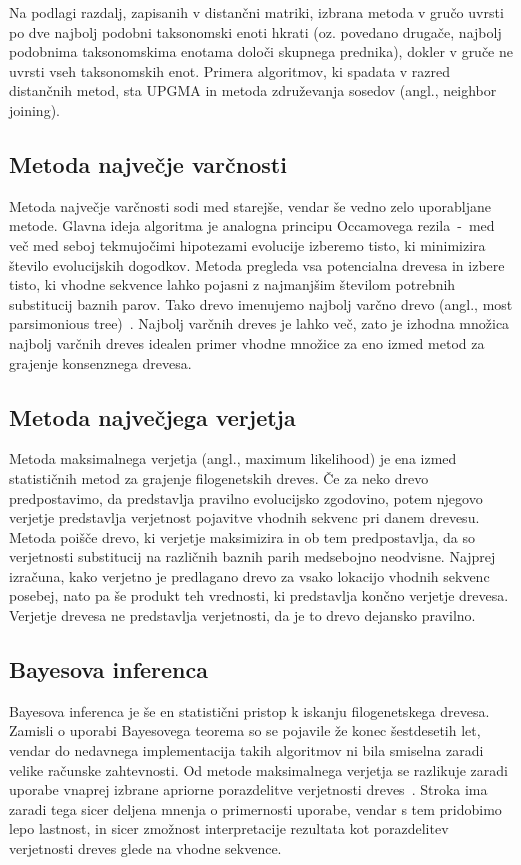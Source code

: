 \documentclass[a4paper, 12pt]{book}
\begin{document}
\noindent Na podlagi razdalj, zapisanih v distančni matriki, izbrana metoda v gručo 
uvrsti po dve najbolj podobni taksonomski enoti hkrati (oz. povedano drugače, 
najbolj podobnima taksonomskima enotama določi skupnega prednika), dokler v 
gruče ne uvrsti vseh taksonomskih enot. Primera algoritmov, ki spadata v razred 
distančnih metod, sta UPGMA in metoda združevanja sosedov (angl., neighbor joining). 

\subsection{Metoda največje varčnosti}
Metoda največje varčnosti sodi med starejše, vendar še vedno zelo uporabljane 
metode. Glavna ideja algoritma je analogna principu Occamovega rezila~-~med več 
med seboj tekmujočimi hipotezami evolucije izberemo tisto, ki minimizira število 
evolucijskih dogodkov. Metoda pregleda vsa potencialna drevesa in izbere tisto, 
ki vhodne sekvence lahko pojasni z najmanjšim številom potrebnih substitucij 
baznih parov. Tako drevo imenujemo najbolj varčno drevo 
(angl., most parsimonious tree)~\cite{parsimony}. Najbolj varčnih dreves je lahko
več, zato je izhodna množica najbolj varčnih dreves idealen primer vhodne množice 
za eno izmed metod za grajenje konsenznega drevesa.

\subsection{Metoda največjega verjetja}
Metoda maksimalnega verjetja (angl., maximum likelihood) je ena izmed statističnih
metod za grajenje filogenetskih dreves. Če za neko drevo predpostavimo, da predstavlja
pravilno evolucijsko zgodovino, potem njegovo verjetje predstavlja verjetnost 
pojavitve vhodnih sekvenc pri danem drevesu. Metoda poišče drevo, ki verjetje 
maksimizira in ob tem predpostavlja, da so verjetnosti substitucij na različnih 
baznih parih medsebojno neodvisne. Najprej izračuna, kako verjetno je predlagano 
drevo za vsako lokacijo vhodnih sekvenc posebej, nato pa še produkt teh vrednosti, 
ki predstavlja končno verjetje drevesa. Verjetje drevesa ne predstavlja verjetnosti, 
da je to drevo dejansko pravilno. 

\subsection{Bayesova inferenca}
Bayesova inferenca je še en statistični pristop k iskanju filogenetskega drevesa. 
Zamisli o uporabi Bayesovega teorema so se pojavile že konec šestdesetih let, 
vendar do nedavnega implementacija takih algoritmov ni bila smiselna zaradi velike
računske zahtevnosti. Od metode maksimalnega verjetja se razlikuje zaradi uporabe 
vnaprej izbrane apriorne porazdelitve verjetnosti dreves~\cite{fel}. Stroka ima 
zaradi tega sicer deljena mnenja o primernosti uporabe, vendar s tem pridobimo 
lepo lastnost, in sicer zmožnost interpretacije rezultata kot porazdelitev 
verjetnosti dreves glede na vhodne sekvence.
\end{document}
